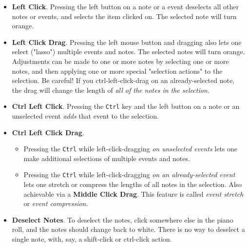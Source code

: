    \begin{itemize}
      \item {} 
         \textbf{Left Click}.
         Pressing the left button on a note or a event deselects all other
         notes or events, and selects the item clicked on.
         The selected note will turn orange.
      \item {} 
         \textbf{Left Click Drag}.
         Pressing the left mouse button and dragging also lets one
         select ("lasso") multiple events and notes.
         The selected notes will turn orange.
         Adjustments can be made to one or more notes by selecting one or more
         notes, and then applying one or more special
          "selection actions" to the selection.
         Be careful!  If you ctrl-left-click-drag on an already-selected note,
         the drag will change the length of
         \textsl{all of the notes in the selection}.
      \item {}
         \textbf{Ctrl Left Click}.
         Pressing the \texttt{Ctrl} key and the left button on a note or an
         unselected event \textsl{adds} that event to the selection.
      \item {}
         \textbf{Ctrl Left Click Drag}.
         \begin{itemize}
            \item Pressing the \texttt{Ctrl} while left-click-dragging
               \textsl{on unselected events} lets one make additional
               selections of multiple events and notes.
            \item Pressing the \texttt{Ctrl} while left-click-dragging
               \textsl{on an already-selected event} lets one stretch or
               compress the lengths of all notes in the selection.
               Also achievable via a \textbf{Middle Click Drag}.
               This feature is called \textsl{event stretch}
               or \textsl{event compression}.
         \end{itemize}
      \item {} 
         \textbf{Deselect Notes}.
         To deselect the notes, click somewhere else in the piano roll, and the
         notes should change back to white.  There is no way to deselect a single
         note, with, say, a shift-click or ctrl-click action.
   \end{itemize}

